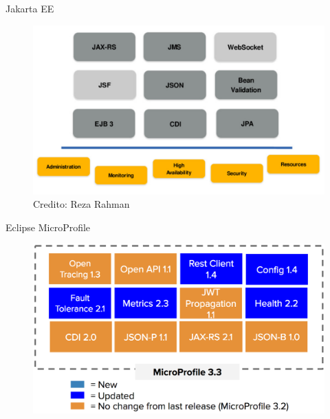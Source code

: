 \documentclass[aspectratio=169]{beamer}
\begin{document}
\begin{frame}{Jakarta EE}
\begin{figure}
	\centering
	\includegraphics[width=0.8\linewidth]{Images/javaeemicropancake}
	\caption{Credito: Reza Rahman}
\end{figure}
\end{frame}


\begin{frame}{Eclipse MicroProfile}
\begin{figure}
	\centering
	\includegraphics[width=\linewidth]{Images/mp33}
\end{figure}
\end{frame}
\end{document}
